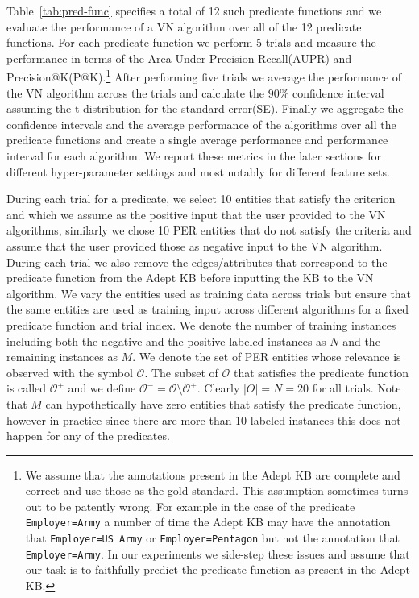 \documentclass[paper=a4,fontsize=11pt]{scrartcl}
\newcommand{\Tabref}[1]{Table~\ref{#1}}
\numberwithin{equation}{section}    %
\numberwithin{figure}{section}      %
\numberwithin{table}{section}       %
\begin{document}
\Tabref{tab:pred-func} specifies a total of 12 such predicate functions and we
evaluate the performance of a VN algorithm over all of the 12 predicate
functions. For each predicate function we perform 5 trials and measure the
performance in terms of the Area Under Precision-Recall(AUPR) and
Precision@K(P@K).\footnote{We assume that the annotations present in the Adept
KB are complete and correct and use those as the gold standard. This assumption
sometimes turns out to be patently wrong. For example in the case of the
predicate \texttt{Employer=Army} a number of time the Adept KB may have the
annotation that \texttt{Employer=US Army} or \texttt{Employer=Pentagon} but not
the annotation that \texttt{Employer=Army}. In our experiments we side-step
these issues and assume that our task is to faithfully predict the predicate
function as present in the Adept KB.} After performing five trials we average the
performance of the VN algorithm across the trials and calculate the $90\%$
confidence interval assuming the t-distribution for the standard
error(SE). Finally we aggregate the confidence intervals and the average
performance of the algorithms over all the predicate functions and create a
single average performance and performance interval for each algorithm. We
report these metrics in the later sections for different hyper-parameter
settings and most notably for different feature sets.

During each trial for a predicate, we select 10 entities that satisfy the
criterion and which we assume as the positive input that the user provided to
the VN algorithms, similarly we chose 10 \textsc{PER} entities that do not
satisfy the criteria and assume that the user provided those as negative input
to the VN algorithm. During each trial we also remove the edges/attributes that
correspond to the predicate function from the Adept KB before inputting the KB
to the VN algorithm.  We vary the entities used as training data across trials
but ensure that the same entities are used as training input across different
algorithms for a fixed predicate function and trial index. We denote the number
of training instances including both the negative and the positive labeled
instances as $N$ and the remaining instances as $M$.  We denote the set of
\textsc{PER} entities whose relevance is observed with the symbol
$\mathcal{O}$.
The subset of $\mathcal{O}$ that satisfies the predicate function is called
$\mathcal{O}^{+}$ and we define $\mathcal{O}^{-} = \mathcal{O} \setminus \mathcal{O}^{+}$.
Clearly $\vert O \vert = N=20$ for all trials.  Note that $M$ can
hypothetically have zero entities that satisfy the predicate function, however
in practice since there are more than 10 labeled instances this does not happen
for any of the predicates.
\end{document}
